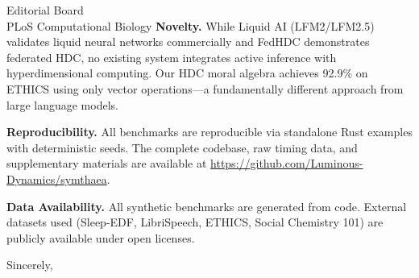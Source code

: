 \documentclass[11pt]{letter}
\begin{document}
\begin{letter}{Editorial Board\\PLoS Computational Biology}
\textbf{Novelty.} While Liquid AI (LFM2/LFM2.5) validates liquid neural networks commercially and FedHDC demonstrates federated HDC, no existing system integrates active inference with hyperdimensional computing. Our HDC moral algebra achieves 92.9\% on ETHICS using only vector operations---a fundamentally different approach from large language models.

\textbf{Reproducibility.} All benchmarks are reproducible via standalone Rust examples with deterministic seeds. The complete codebase, raw timing data, and supplementary materials are available at \url{https://github.com/Luminous-Dynamics/symthaea}.

\textbf{Data Availability.} All synthetic benchmarks are generated from code. External datasets used (Sleep-EDF, LibriSpeech, ETHICS, Social Chemistry 101) are publicly available under open licenses.

\closing{Sincerely,}

\end{letter}
\end{document}
